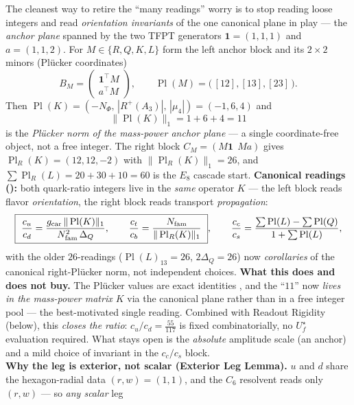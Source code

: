 \begin{keybox}
The cleanest way to retire the ``many readings'' worry is to stop reading loose integers and read
\emph{orientation invariants} of the one canonical plane in play --- the \emph{anchor plane} spanned by the
two TFPT generators $\mathbf1=(1,1,1)$ and $a=(1,1,2)$. For $M\in\{R,Q,K,L\}$ form the left anchor block
and its $2{\times}2$ minors (Plücker coordinates)
\[
  B_M=\begin{pmatrix}\mathbf1^{\!\top}\!M\\ a^{\!\top}\!M\end{pmatrix},\qquad
  \operatorname{Pl}(M)=\bigl(\,[12],[13],[23]\,\bigr).
\]
Then $\operatorname{Pl}(K)=(-N_\Phi,\,|R^+(A_3)|,\,|\mu_4|)=(-1,6,4)$ and
\[
  \boxed{\ \|\operatorname{Pl}(K)\|_1=1+6+4=11\ }
\]
is the \emph{Plücker norm of the mass-power anchor plane} --- a single coordinate-free object, not a free
integer. The right block $C_M=(M\mathbf1\,\;M a)$ gives $\operatorname{Pl}_R(K)=(12,12,-2)$ with
$\|\operatorname{Pl}_R(K)\|_1=26$, and
$\sum\operatorname{Pl}_R(L)=20{+}30{+}10=60$ is the $E_8$ cascade start. \textbf{Canonical readings
():} both quark-ratio integers live in the \emph{same} operator $K$ --- the
left block reads flavor \emph{orientation}, the right block reads transport \emph{propagation}:
\[
  \boxed{\ \frac{c_u}{c_d}=\frac{\gcar\,\|\operatorname{Pl}(K)\|_1}{\Nfam^2\,\Delta_Q},\qquad
  \frac{c_t}{c_b}=\frac{\Nfam}{\|\operatorname{Pl}_R(K)\|_1}\ },\qquad
  \frac{c_c}{c_s}=\frac{\sum\operatorname{Pl}(L)-\sum\operatorname{Pl}(Q)}{1+\sum\operatorname{Pl}(L)},
\]
with the older $26$-readings ($\operatorname{Pl}(L)_{13}=26$, $2\Delta_Q=26$) now \emph{corollaries} of
the canonical right-Plücker norm, not independent choices.
\textbf{What this does and does not buy.} The Plücker values are exact identities \mE, and the ``$11$'' now
\emph{lives in the mass-power matrix $K$} via the canonical plane rather than in a free integer pool --- the
best-motivated single reading. Combined with Readout Rigidity (below), this \emph{closes the ratio}:
$c_u/c_d=\tfrac{55}{117}$ is fixed combinatorially, no $U_f^\star$ evaluation required. What stays open is the
\emph{absolute} amplitude scale (an anchor) and a mild choice of invariant in the $c_c/c_s$ block.
\smallskip\\
\noindent\textbf{Why the leg is exterior, not scalar (Exterior Leg Lemma).} $u$ and $d$ share the
hexagon-radial data $(r,w)=(1,1)$, and the $C_6$ resolvent reads only $(r,w)$ --- so \emph{any scalar} leg

\end{keybox}
